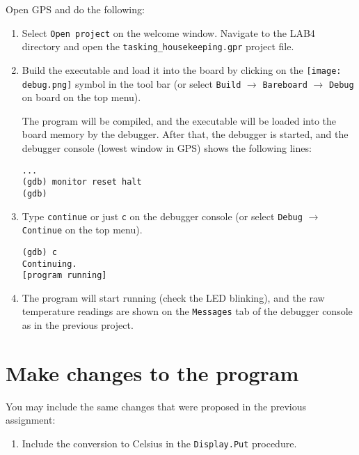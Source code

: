 Open GPS and do the following:
\begin{enumerate}
\item Select {\tt Open project} on the welcome window. Navigate to the LAB4 directory and open the {\tt tasking\_housekeeping.gpr} project file.

\item Build the executable and load it into the board by clicking on the \hbox{\texttt{[image: debug.png]}} symbol in the tool bar (or select {\tt Build} $\rightarrow$ {\tt Bareboard} $\rightarrow$ {\tt Debug} on board on the top menu).

The program will be compiled, and the executable will be loaded into the board memory by the debugger. After that, the debugger is started, and the debugger console (lowest window in GPS) shows the following lines:
\begin{verbatim}
...
(gdb) monitor reset halt
(gdb)
\end{verbatim}

\item Type {\tt continue} or just {\tt c} on the debugger console (or select {\tt Debug} $\rightarrow$ {\tt Continue} on the top menu).
\begin{verbatim}
(gdb) c
Continuing.
[program running]
\end{verbatim}

\item The program will start running (check the LED blinking), and the raw temperature readings are shown on the {\tt Messages} tab of the debugger console as in the previous project.
\end{enumerate}

\section{Make changes to the program}

You may include the same changes that were proposed in the previous assignment:

\begin{enumerate}
\item Include the conversion to Celsius in the {\tt Display.Put} procedure.
\end{enumerate}
